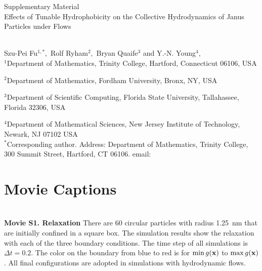 
\thispagestyle{empty}

\newpage
{\Large \bf

  \noindent Supplementary Material\\

  \noindent 
 Effects of Tunable Hydrophobicity on the Collective Hydrodynamics of Janus Particles under Flows}\\

\noindent 
Szu-Pei Fu$^{1,*},$ 
Rolf Ryham$^{2},$ 
Bryan Quaife$^{3}$ and Y.-N. Young$^{4},$
\\

\noindent
$^{1}$Department of Mathematics, Trinity College, Hartford, Connecticut 06106, USA

\noindent
$^{2}$Department of Mathematics, Fordham University, Bronx, NY, USA

\noindent
$^{3}$Department of Scientific Computing, Florida State University, Tallahassee, Florida 32306, USA

\noindent
$^{4}$Department of Mathematical Sciences, New Jersey Institute of Technology, Newark, NJ 07102 USA
\\

\noindent $^*$Corresponding author. Address: Department of Mathematics, Trinity College, 
300 Summit Street, Hartford, CT 06106. email: 



\setcounter{page}{1}

\setcounter{figure}{0}
\renewcommand{\thefigure}{S\arabic{figure}}

\setcounter{equation}{0}
\renewcommand{\theequation}{S\arabic{equation}}

\setcounter{section}{0}
\renewcommand{\thesection}{S\arabic{section}} 




\section{Movie Captions}\mbox{} \\

\noindent
{\bf Movie S1. Relaxation} 
There are 60 circular particles with radius 1.25~nm that are initially
confined in a square box. The simulation results show the relaxation
with each of the three boundary conditions. The time step of all
simulations is $\Delta t=0.2$. The color on the boundary from blue to
red is for $\min g(\mathbf{x})$ to $\max g(\mathbf{x})$. All final configurations are
adopted in simulations with hydrodynamic flows. \\


